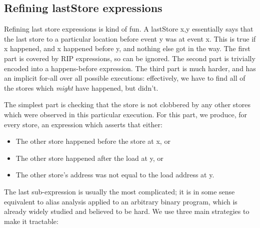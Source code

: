 \documentclass[10pt,a4paper]{report}
\begin{document}
\subsection{Refining lastStore expressions}

Refining last store expressions is kind of
fun.  A lastStore x,y essentially says that the last store to a
particular location before event y was at event x.  This is true if x
happened, and x happened before y, and nothing else got in the way.
The first part is covered by RIP expressions, so can be ignored.  The
second part is trivially encoded into a happens-before expression.
The third part is much harder, and has an implicit for-all over all
possible executions: effectively, we have to find all of the stores
which \emph{might} have happened, but didn't.

The simplest part is checking that the store is not clobbered by any
other stores which were observed in this particular execution.  For
this part, we produce, for every store, an expression which asserts
that either:

\begin{itemize}
\item The other store happened before the store at x, or
\item The other store happened after the load at y, or
\item The other store's address was not equal to the load address at
  y.
\end{itemize}

The last sub-expression is usually the most complicated; it is in some
sense equivalent to alias analysis applied to an arbitrary binary
program, which is already widely studied and believed to be
hard\needCite{}.  We use three main strategies to make it tractable:
\end{document}
